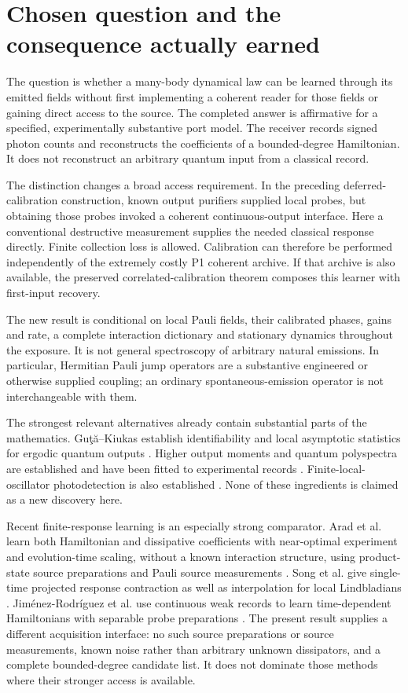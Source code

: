 \documentclass[11pt]{article}
\begin{document}
\section{Chosen question and the consequence actually earned}
The question is whether a many-body dynamical law can be learned through its emitted fields without first implementing a coherent reader for those fields or gaining direct access to the source. The completed answer is affirmative for a specified, experimentally substantive port model. The receiver records signed photon counts and reconstructs the coefficients of a bounded-degree Hamiltonian. It does not reconstruct an arbitrary quantum input from a classical record.

The distinction changes a broad access requirement. In the preceding deferred-calibration construction, known output purifiers supplied local probes, but obtaining those probes invoked a coherent continuous-output interface. Here a conventional destructive measurement supplies the needed classical response directly. Finite collection loss is allowed. Calibration can therefore be performed independently of the extremely costly P1 coherent archive. If that archive is also available, the preserved correlated-calibration theorem composes this learner with first-input recovery.

The new result is conditional on local Pauli fields, their calibrated phases, gains and rate, a complete interaction dictionary and stationary dynamics throughout the exposure. It is not general spectroscopy of arbitrary natural emissions. In particular, Hermitian Pauli jump operators are a substantive engineered or otherwise supplied coupling; an ordinary spontaneous-emission operator is not interchangeable with them.

The strongest relevant alternatives already contain substantial parts of the mathematics. Gu\c{t}\u{a}--Kiukas establish identifiability and local asymptotic statistics for ergodic quantum outputs \cite{guta}. Higher output moments and quantum polyspectra are established and have been fitted to experimental records \cite{hagele,sifft}. Finite-local-oscillator photodetection is also established \cite{banaszek,finiteLO}. None of these ingredients is claimed as a new discovery here.

Recent finite-response learning is an especially strong comparator. Arad et al. learn both Hamiltonian and dissipative coefficients with near-optimal experiment and evolution-time scaling, without a known interaction structure, using product-state source preparations and Pauli source measurements \cite{arad}. Song et al. give single-time projected response contraction as well as interpolation for local Lindbladians \cite{song}. Jim\'enez-Rodr\'iguez et al. use continuous weak records to learn time-dependent Hamiltonians with separable probe preparations \cite{jimenez}. The present result supplies a different acquisition interface: no such source preparations or source measurements, known noise rather than arbitrary unknown dissipators, and a complete bounded-degree candidate list. It does not dominate those methods where their stronger access is available.
\end{document}

